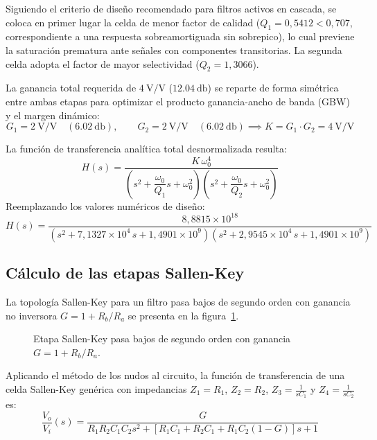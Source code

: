 Siguiendo el criterio de diseño recomendado para filtros activos en cascada, se coloca en primer lugar la celda de
menor factor de calidad ($Q_1 = 0{,}5412 < 0{,}707$, correspondiente a una respuesta sobreamortiguada sin sobrepico),
lo cual previene la saturación prematura ante señales con componentes transitorias. La segunda celda adopta el factor
de mayor selectividad ($Q_2 = 1{,}3066$).

La ganancia total requerida de $\SI{4}{\volt/\volt}$ ($\SI{12.04}{\decibel}$) se reparte de forma simétrica entre
ambas etapas para optimizar el producto ganancia-ancho de banda (GBW) y el margen dinámico:
\begin{equation}
  G_1 = \SI{2}{\volt/\volt} \quad (\SI{6.02}{\decibel}), \qquad G_2 = \SI{2}{\volt/\volt} \quad (\SI{6.02}{\decibel})
  \implies K = G_1 \cdot G_2 = \SI{4}{\volt/\volt}
\end{equation}

La función de transferencia analítica total desnormalizada resulta:
\begin{equation}
  H(s) = \frac{K\,\omega_0^4}{\left( s^2 + \dfrac{\omega_0}{Q_1} s + \omega_0^2 \right)
    \left( s^2 + \dfrac{\omega_0}{Q_2} s + \omega_0^2 \right)}
  \label{eq:pb-transferencia-gral}
\end{equation}
Reemplazando los valores numéricos de diseño:
\begin{equation}
  H(s) = \frac{8{,}8815 \times 10^{18}}{\left( s^2 + 7{,}1327 \times 10^4\,s + 1{,}4901 \times 10^9 \right)
    \left( s^2 + 2{,}9545 \times 10^4\,s + 1{,}4901 \times 10^9 \right)}
  \label{eq:pb-transferencia-num}
\end{equation}

\subsection{Cálculo de las etapas Sallen-Key}
\label{subsec:pb-etapas}

La topología Sallen-Key para un filtro pasa bajos de segundo orden con ganancia no inversora $G = 1 + R_b / R_a$ se
presenta en la figura~\ref{crkt:sk-pasa-bajos}.

\begin{figure}[H]
  \centering
  
  \caption{Etapa Sallen-Key pasa bajos de segundo orden con ganancia $G = 1 + R_b / R_a$.}
  \label{crkt:sk-pasa-bajos}
\end{figure}

Aplicando el método de los nudos al circuito, la función de transferencia de una celda Sallen-Key genérica con
impedancias $Z_1 = R_1$, $Z_2 = R_2$, $Z_3 = \frac{1}{s C_1}$ y $Z_4 = \frac{1}{s C_2}$ es:
\begin{equation}
  \frac{V_o}{V_i}(s) = \frac{G}{R_1 R_2 C_1 C_2 s^2 + \left[ R_1 C_1 + R_2 C_1 + R_1 C_2 (1 - G) \right] s + 1}
  \label{eq:pb-sk-h}
\end{equation}

